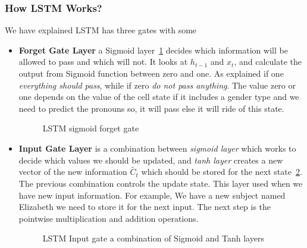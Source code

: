 \newpage
\subsubsection{How LSTM Works?}

We have explained LSTM has three gates with some 

\begin{itemize}
  
\item \textbf{Forget Gate Layer} a Sigmoid layer~\ref{fig:LSTM-forget-gate} decides which information will be allowed to pass and which will not. It looks at $h_{t-1}$ and $x_t$, and calculate the output from Sigmoid function between zero and one. As explained if one \textit{everything should pass}, while if zero \textit{do not pass anything}. The value zero or one depends on the value of the cell state if it includes a gender type and we need to predict the pronouns so, it will pass else it will ride of this state.


\begin{figure}[ht!]
    \centering
        
        \caption{LSTM sigmoid forget gate~\cite{colah}}\label{fig:LSTM-forget-gate}
\end{figure}



\item \textbf{Input Gate Layer} is a combination between \textit{sigmoid layer} which works to decide which values we should be updated, and \textit{tanh layer} creates a new vector of the new information $\tilde{C_t}$ which should be stored for the next state~\ref{fig:LSTM-input-gate}. The previous combination controls the update state. This layer used when we have new input information. For example, We have a new subject named Elizabeth we need to store it for the next input. The next step is the pointwise multiplication and addition operations.

\begin{figure}[ht!]
    \centering
        
        \caption{LSTM Input gate a combination of Sigmoid and Tanh layers~\cite{colah}}
        \label{fig:LSTM-input-gate}
\end{figure}



\end{itemize}
